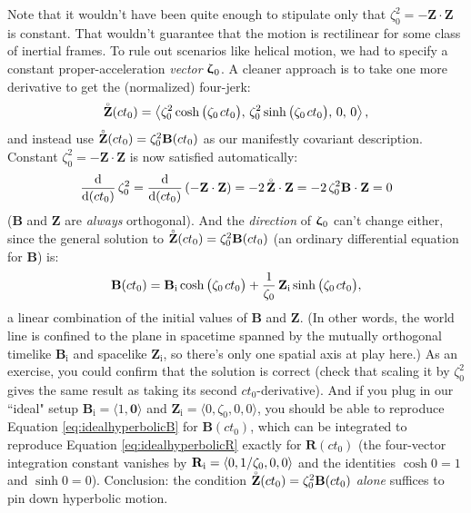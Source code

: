 \documentclass[12pt]{article}
\renewcommand{\mathring}[1]{\accentset{\circ}{#1}}
\renewcommand{\vv}[1]{\mathbf{#1}}
\newcommand{\dd}[1]{\mathrm{d}#1}
\newcommand{\vvzeta}{\bm{\upzeta}}
\begin{document}
Note that it wouldn't have been quite enough to stipulate only that ${\zeta_0^2 = - \vv Z \cdot \vv Z }$ is constant. That wouldn't guarantee that the motion is rectilinear for some class of inertial frames. To rule out scenarios like helical motion, we had to specify a constant proper-acceleration \emph{vector} $\vvzeta_{\mkern1mu 0}$. A cleaner approach is to take one more derivative to get the (normalized) four-jerk:
\begin{equation*}
\mathring{ \vv Z } (ct_0) = \left \langle  \zeta_0^2 \cosh \big( \zeta_0 \mkern2mu ct_0 \big), \,  \zeta_0^2 \sinh \big( \zeta_0 \mkern2mu ct_0 \big), \, 0, \, 0 \right \rangle ,
\end{equation*}
and instead use $\mathring{\vv Z} (ct_0) = \zeta_0^2 \vv B (ct_0)$ as our manifestly covariant description. Constant ${\zeta_0^2 = - \vv Z \cdot \vv Z }$ is now satisfied automatically:
\begin{equation*}
\frac{\dd}{\dd (c t_0)} \, \zeta_0^2 = \frac{\dd}{\dd (c t_0)} \left(- \vv Z \cdot \vv Z \right) = - 2 \, \mathring{ \vv Z } \cdot \vv Z = - 2 \, \zeta_0^2 \vv B \cdot \vv Z = 0
\end{equation*}
($\vv B$ and $\vv Z$ are \emph{always} orthogonal). And the \emph{direction} of $\vvzeta_{\mkern1mu 0}$ can't change either, since the general solution to ${\mathring{\vv Z} (ct_0) = \zeta_0^2 \vv B (ct_0)}$ (an ordinary differential equation for $\vv B$) is:
\begin{equation*}
\vv B (ct_0) = \vv B_{\mathrm{i}} \cosh \big( \zeta_0 \mkern2mu ct_0 \big) + \dfrac{1}{\zeta_0} \, \vv Z_{\mathrm{i}} \sinh \big( \zeta_0 \mkern2mu ct_0 \big) ,
\end{equation*}
a linear combination of the initial values of $\vv B$ and $\vv Z$. (In other words, the world line is confined to the plane in spacetime spanned by the mutually orthogonal timelike $\vv B_{\mathrm{i}}$ and spacelike $\vv Z_{\mathrm{i}}$, so there's only one spatial axis at play here.) As an exercise, you could confirm that the solution is correct (check that scaling it by $\zeta_0^2$ gives the same result as taking its second $ct_0$-derivative). And if you plug in our ``ideal" setup $\vv B_{\mathrm{i}} = \langle 1, \vv 0 \rangle$ and ${\vv Z_{\mathrm{i}} = \langle 0, \zeta_0, 0, 0 \rangle }$, you should be able to reproduce Equation \ref{eq:idealhyperbolicB} for $\vv B (ct_0)$, which can be integrated to reproduce Equation \ref{eq:idealhyperbolicR} exactly for $\vv R (ct_0)$ (the four-vector integration constant vanishes by $\vv R_{\mkern.5mu \mathrm{i}} = \langle 0, 1/\zeta_0, 0, 0 \rangle$ and the identities $\cosh 0 = 1$ and $\sinh 0 = 0$). Conclusion: the condition $\mathring{\vv Z} (ct_0) = \zeta_0^2 \vv B (ct_0)$ \emph{alone} suffices to pin down hyperbolic motion.
\end{document}
